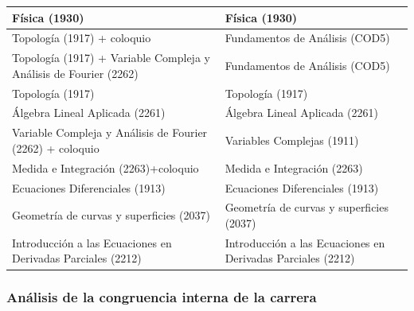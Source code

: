 \documentclass[a4paper, 12pt]{article}
\begin{document}
\begin{center}
\begin{tabularx}{1\textwidth}{|>{\raggedright\arraybackslash}X |
>{\raggedright\arraybackslash}X |}
Física          (1930)                & Física    (1930)             \\ \hline

Topología   (1917) + coloquio & Fundamentos de Análisis   (COD5)                      \\
\hline
Topología   (1917) + Variable Compleja y Análisis de Fourier (2262) & Fundamentos de Análisis   (COD5)                      \\
\hline



Topología   (1917)                &Topología   (1917)       \\
\hline

Álgebra Lineal Aplicada (2261)      & Álgebra Lineal Aplicada (2261)       \\\hline

Variable Compleja y Análisis de Fourier (2262) + coloquio   & Variables Complejas (1911)               \\
\hline

Medida e Integración (2263)+coloquio   & Medida e Integración (2263) \\
\hline

Ecuaciones Diferenciales    (1913)     &Ecuaciones Diferenciales (1913)   \\
\hline

Geometría de curvas y superficies  (2037)  & Geometría de curvas y superficies  (2037)
\\\hline

Introducción a las Ecuaciones en Derivadas Parciales (2212) & 
Introducción a las Ecuaciones en Derivadas Parciales (2212)
\\\hline
\end{tabularx}
\end{center}

\normalfont
\newpage


\subsubsection{Análisis de la congruencia interna de la carrera}
\fontsize{10pt}{10pt}\selectfont 
 
\end{document}
